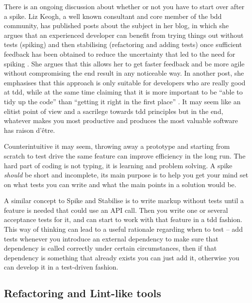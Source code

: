 \documentclass[11pt]{article}
\begin{document}
There is an ongoing discussion about whether or not you have to start over after a spike. Liz Keogh, a well known consultant and core member of the \gls{bdd} community, has published posts about the subject in her blog, in which she argues that an experienced developer can benefit from trying things out without tests (spiking) and then stabilising (refactoring and adding tests) once sufficient feedback has been obtained to reduce the uncertainty that led to the need for spiking \cite{Liz1}. She argues that this allows her to get faster feedback and be more agile without compromising the end result in any noticeable way. In another post, she emphasises that this approach is only suitable for developers who are really good at \gls{tdd}, while at the same time claiming that it is more important to be ``able to tidy up the code'' than ``getting it right in the first place'' \cite{Liz2}. It may seem like an elitist point of view and a sacrilege towards \gls{tdd} principles but in the end, whatever makes you most productive and produces the most valuable software has raison d'être.

Counterintuitive it may seem, throwing away a prototype and starting from scratch to test drive the same feature can improve efficiency in the long run. The hard part of coding is not typing, it is learning and problem solving. A spike \emph{should} be short and incomplete, its main purpose is to help you get your mind set on what tests you can write and what the main points in a solution would be. \cite[question~60]{Edelstam}

A similar concept to Spike and Stabilise is to write markup without tests until a feature is needed that could use an API call. Then you write one or several acceptance tests for it, and can start to work with that feature in a \gls{tdd} fashion. \cite[question~30]{Ahnve} %
This way of thinking can lead to a useful rationale regarding when to test -- add tests whenever you introduce an external dependency to make sure that dependency is called correctly under certain circumstances, then if that dependency is something that already exists you can just add it, otherwise you can develop it in a test-driven fashion.

\subsection{Refactoring and Lint-like tools}
\label{subsec:refactor}
\end{document}
